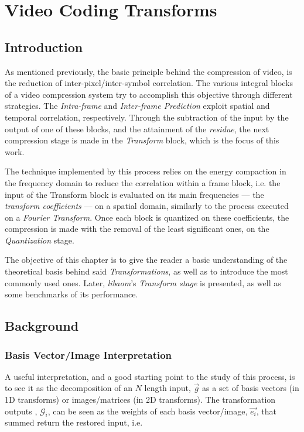 \cleardoublepage
\chapter{Video Coding Transforms} \label{chap:trans}

\section{{Introduction}}

As mentioned previously, the basic principle behind the compression of video, is the reduction of inter-pixel/inter-symbol correlation. The various integral blocks of a video compression system try to accomplish this objective through different strategies. The \emph{Intra-frame} and \emph{Inter-frame Prediction} exploit spatial and temporal correlation, respectively. Through the subtraction of the input by the output of one of these blocks, and the attainment of the \emph{residue}, the next compression stage is made in the \emph{Transform} block, which is the focus of this work.

The technique implemented by this process relies on the energy compaction in the frequency domain to reduce the correlation within a frame block, i.e. the input of the Transform block is evaluated on its main frequencies --- the \emph{transform coefficients} --- on a spatial domain, similarly to the process executed on a \emph{Fourier Transform}. Once each block is quantized on these coefficients, the compression is made with the removal of the least significant ones, on the \emph{Quantization} stage. 

The objective of this chapter is to give the reader a basic understanding of the theoretical basis behind said \emph{Transformations}, as well as to introduce the most commonly used ones. Later, \emph{libaom}'s \emph{Transform stage} is presented, as well as some benchmarks of its performance.

\section{Background}
\subsection{Basis Vector/Image Interpretation}
A useful interpretation, and a good starting point to the study of this process, is to see it as the decomposition of an $N$ length input, $\vec{g}$ as a set of basis vectors (in 1D transforms) or images/matrices (in 2D transforms). The transformation outputs , $\mathcal{G}_i$, can be seen as the weights of each basis vector/image, $\vec{e_i}$, that summed return the restored input, i.e.

